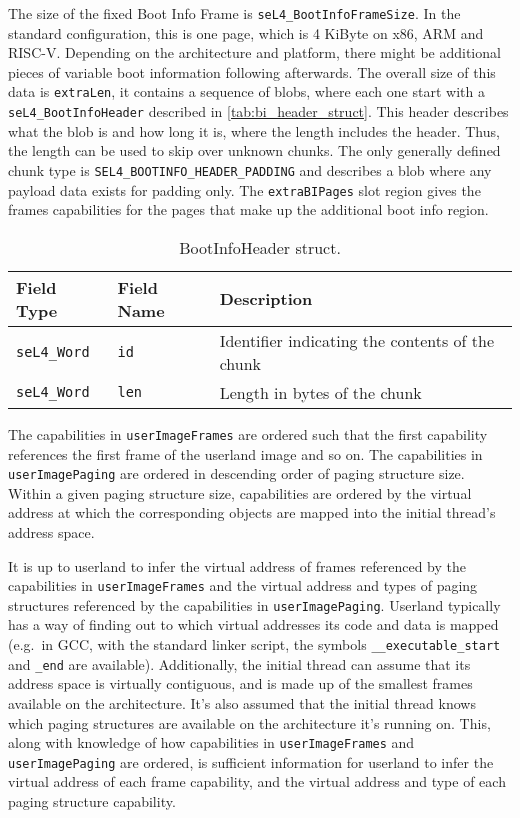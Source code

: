 The size of the fixed Boot Info Frame is \texttt{seL4\_BootInfoFrameSize}. In the standard
configuration, this is one page, which is 4 KiByte on x86, ARM and RISC-V. Depending on the
architecture and platform, there might be additional pieces of variable boot information
following afterwards. The overall size of this data is \texttt{extraLen}, it contains a
sequence of blobs, where each one start with a \texttt{seL4\_BootInfoHeader} described in
\autoref{tab:bi_header_struct}. This header describes what the blob is and how long it is,
where the length includes the header. Thus, the length can be used to skip over unknown
chunks. The only generally defined chunk type is \texttt{SEL4\_BOOTINFO\_HEADER\_PADDING}
and describes a blob where any payload data exists for padding only. The
\texttt{extraBIPages} slot region gives the frames capabilities for the pages that make up
the additional boot info region.

\begin{table}[htb]
  \begin{center}
    \caption{BootInfoHeader struct.}
    \label{tab:bi_header_struct}
    \begin{tabular}{lll}
      \toprule
      Field Type & Field Name & Description \\
      \midrule
      \texttt{seL4\_Word} & \texttt{id}  & Identifier indicating the contents of the chunk \\
      \texttt{seL4\_Word} & \texttt{len} & Length in bytes of the chunk \\
      \bottomrule
    \end{tabular}
  \end{center}
\end{table}

The capabilities in \texttt{userImageFrames} are
ordered such that the first capability references the first frame of the
userland image and so on.
The capabilities in \texttt{userImagePaging} are ordered in descending order
of paging structure size. Within a given paging structure size, capabilities are
ordered by the virtual address at which the corresponding objects are mapped
into the initial thread's address space.

It is up to userland to infer the virtual address of frames referenced by
the capabilities in \texttt{userImageFrames} and the virtual address and
types of paging structures
referenced by the capabilities in \texttt{userImagePaging}.
Userland typically has a way of finding out to which virtual addresses its
code and data is mapped (e.g.\ in GCC, with the standard linker script, the
symbols \texttt{\_\_executable\_start} and \texttt{\_end} are available).
Additionally, the initial thread can assume that its address space is virtually
contiguous, and is made up of the smallest frames available on the architecture.
It's also assumed that the initial thread knows which paging structures are
available on the architecture it's running on.
This, along with knowledge of how capabilities in \texttt{userImageFrames} and
\texttt{userImagePaging} are ordered, is sufficient information for userland to infer
the virtual address of each
frame capability, and the virtual address and type of each paging structure capability.


